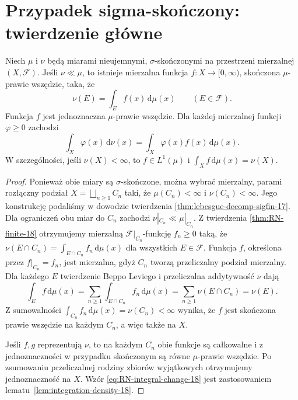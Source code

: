 \section{Przypadek sigma-skończony: twierdzenie główne}
\begin{twierdzenie}
\label{thm:RN-sigfin-18}
Niech $\mu$ i $\nu$ będą miarami nieujemnymi,
$\sigma$-skończonymi na przestrzeni mierzalnej $(X,\mathcal F)$.
Jeśli $\nu\ll\mu$, to istnieje mierzalna funkcja
$f:X\to[0,\infty)$, skończona $\mu$-prawie wszędzie,
taka, że
\begin{equation}\label{eq:RN-general-18}
\nu(E)=\int_E f(x)\,\mathrm d\mu(x)
\qquad(E\in\mathcal F).
\end{equation}
Funkcja $f$ jest jednoznaczna $\mu$-prawie wszędzie.
Dla każdej mierzalnej funkcji $\varphi\ge0$ zachodzi
\begin{equation}\label{eq:RN-integral-change-18}
\int_X\varphi(x)\,\mathrm d\nu(x)
=\int_X\varphi(x)f(x)\,\mathrm d\mu(x).
\end{equation}
W szczególności, jeśli $\nu(X)<\infty$, to
$f\in L^1(\mu)$ i $\int_Xf\,\mathrm d\mu(x)=\nu(X)$.
\end{twierdzenie}
\begin{proof}
Ponieważ obie miary są $\sigma$-skończone,
można wybrać mierzalny, parami rozłączny podział
$X=\bigsqcup_{n\ge1}C_n$ taki, że
$\mu(C_n)<\infty$ i $\nu(C_n)<\infty$.
Jego konstrukcję podaliśmy w dowodzie twierdzenia
\ref{thm:lebesgue-decomp-sigfin-17}.
Dla ograniczeń obu miar do $C_n$ zachodzi
$\nu|_{C_n}\ll\mu|_{C_n}$. Z twierdzenia
\ref{thm:RN-finite-18} otrzymujemy mierzalną
$\mathcal F|_{C_n}$-funkcję $f_n\ge0$ taką, że
$\nu(E\cap C_n)=\int_{E\cap C_n}f_n\,\mathrm d\mu(x)$
dla wszystkich $E\in\mathcal F$.
Funkcja $f$, określona przez $f|_{C_n}=f_n$,
jest mierzalna, gdyż $C_n$ tworzą przeliczalny
podział mierzalny. Dla każdego $E$ twierdzenie
Beppo Leviego i przeliczalna addytywność $\nu$ dają
\[
\int_E f\,\mathrm d\mu(x)
=\sum_{n\ge1}\int_{E\cap C_n}f_n\,\mathrm d\mu(x)
=\sum_{n\ge1}\nu(E\cap C_n)=\nu(E).
\]
Z sumowalności $\int_{C_n}f_n\,\mathrm d\mu(x)=\nu(C_n)<\infty$
wynika, że $f$ jest skończona prawie wszędzie na każdym
$C_n$, a więc także na $X$.

Jeśli $f,g$ reprezentują $\nu$, to na każdym $C_n$
obie funkcje są całkowalne i z jednoznaczności w
przypadku skończonym są równe $\mu$-prawie wszędzie.
Po zsumowaniu przeliczalnej rodziny zbiorów wyjątkowych
otrzymujemy jednoznaczność na $X$.
Wzór \eqref{eq:RN-integral-change-18} jest zastosowaniem
lematu~\ref{lem:integration-density-18}.
\end{proof}

